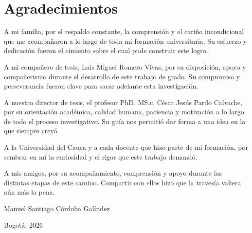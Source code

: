 \chapter*{Agradecimientos}
\vspace{1em}

\setlength{\parindent}{0pt}

A mi familia, por el respaldo constante, la comprensión y el cariño incondicional que me acompañaron a lo largo de toda mi formación universitaria. Su esfuerzo y dedicación fueron el cimiento sobre el cual pude construir este logro.

\vspace{1em}
A mi compañero de tesis, Luis Miguel Romero Vivas, por su disposición, apoyo y compañerismo durante el desarrollo de este trabajo de grado. Su compromiso y perseverancia fueron clave para sacar adelante esta investigación.

\vspace{1em}
A nuestro director de tesis, el profesor PhD. MS.c. César Jesús Pardo Calvache, por su orientación académica, calidad humana, paciencia y motivación a lo largo de todo el proceso investigativo. Su guía nos permitió dar forma a una idea en la que siempre creyó.

\vspace{1em}
A la Universidad del Cauca y a cada docente que hizo parte de mi formación, por sembrar en mí la curiosidad y el rigor que este trabajo demandó.

\vspace{1em}
A mis amigos, por su acompañamiento, comprensión y apoyo durante las distintas etapas de este camino. Compartir con ellos hizo que la travesía valiera aún más la pena.

\vspace{1em}

\begin{flushright}
    Manuel Santiago Córdoba Galíndez

    Bogotá, 2026
\end{flushright}
